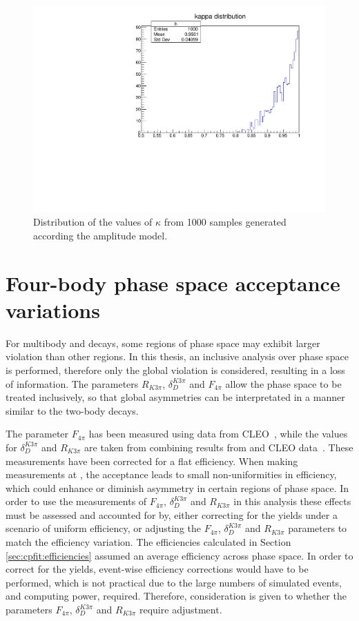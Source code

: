 \begin{figure}[h]
\centering
\includegraphics[trim = 0mm 0mm 0mm 8mm, clip, width=0.5\linewidth]{figures/results/kappa.pdf}
\caption{Distribution of the values of $\kappa$ from 1000 samples generated according the amplitude model.}
\label{kappadistribution}
\end{figure}

\section{Four-body phase space acceptance variations}
\label{sec:interpretation:inputs}

For multibody \decay{\Dz}{\Kmp\pipm\pimp\pipm} and \decay{\Dz}{\pip\pim\pip\pim} decays, some regions of phase space may exhibit larger \CP violation than other regions. In this thesis, an inclusive analysis over phase space is performed, therefore only the global \CP violation is considered, resulting in a loss of information. The parameters $R_{K3\pi}$, $\delta_D^{K3\pi}$ and $F_{4\pi}$ allow the phase space to be treated inclusively, so that global asymmetries can be interpretated in a manner similar to the two-body \Dz decays.

The parameter $F_{4\pi}$ has been measured using data from CLEO~\cite{charm4pi}, while the values for $\delta_D^{K3\pi}$ and $R_{K3\pi}$ are taken from combining results from \lhcb and CLEO data~\cite{charmk3pi,charmk3pi_errata,LHCb-PAPER-2015-057}. These measurements have been corrected for a flat efficiency. When making measurements at \lhcb, the \lhcb acceptance leads to small non-uniformities in efficiency, which could enhance or diminish asymmetry in certain regions of phase space. In order to use the measurements of $F_{4\pi}$, $\delta_D^{K3\pi}$ and $R_{K3\pi}$ in this analysis these effects must be assessed and accounted for by, either correcting for the \lhcb yields under a scenario of uniform efficiency, or adjusting the $F_{4\pi}$, $\delta_D^{K3\pi}$ and $R_{K3\pi}$ parameters to match the \lhcb efficiency variation. The efficiencies calculated in Section \ref{sec:cpfit:efficiencies} assumed an average efficiency across phase space. In order to correct for the \lhcb yields, event-wise efficiency corrections would have to be performed, which is not practical due to the large numbers of simulated events, and computing power, required. Therefore, consideration is given to whether the parameters $F_{4\pi}$, $\delta_D^{K3\pi}$ and $R_{K3\pi}$ require adjustment.

